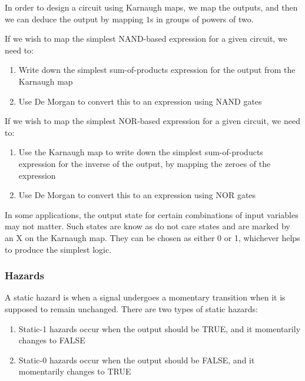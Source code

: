 \documentclass{article}
\begin{document}
In order to design a circuit using Karnaugh maps, we map the outputs, and then we can deduce the output by mapping $1$s in groups of powers of two.

\begin{proposition}
    If we wish to map the simplest NAND-based expression for a given circuit, we need to:
    \begin{enumerate}
        \item Write down the simplest sum-of-products expression for the output from the Karnaugh map
        \item Use De Morgan to convert this to an expression using NAND gates
    \end{enumerate}
\end{proposition}

\begin{proposition}
    If we wish to map the simplest NOR-based expression for a given circuit, we need to:
    \begin{enumerate}
        \item Use the Karnaugh map to write down the simplest sum-of-products expression for the inverse of the output, by mapping the zeroes of the expression
        \item Use De Morgan to convert this to an expression using NOR gates
    \end{enumerate}
\end{proposition}

\begin{definition}
    In some applications, the output state for certain combinations of input variables may not matter. Such states are know as do not care states and are marked by an X on the Karnaugh map. They can be chosen as either 0 or 1, whichever helps to produce the simplest logic.
\end{definition}

\subsubsection{Hazards}

\begin{definition}
    A static hazard is when a signal undergoes a momentary transition when it is supposed to remain unchanged. There are two types of static hazards:
    \begin{enumerate}
        \item Static-1 hazards occur when the output should be TRUE, and it momentarily changes to FALSE
        \item Static-0 hazards occur when the output should be FALSE, and it momentarily changes to TRUE
    \end{enumerate}
\end{definition}
\end{document}
